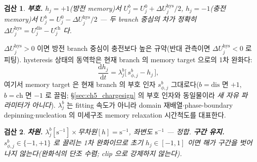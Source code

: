 \documentclass[11pt,a4paper]{article}
\newtheorem*{verifybox}{검산}
\newcommand{\dd}{\mathrm{d}}
\newcommand{\dis}{\mathrm{dis}}
\newcommand{\chg}{\mathrm{ch}}
\newcommand{\hys}{\mathrm{hys}}
\begin{document}
\begin{verifybox}
\textbf{부호.} $h_j=+1$(방전 memory)서 $U_j^b=U_j^0+\Delta U_j^\hys/2$, $h_j=-1$(충전 memory)서
$U_j^b=U_j^0-\Delta U_j^\hys/2$ — 두 branch 중심의 차가 정확히 $\Delta U_j^\hys=U_j^\dis-U_j^\chg$ 다.
\end{verifybox}

$\Delta U_j^\hys>0$ 이면 방전 branch 중심이 충전보다 높은 규약(반대 관측이면 $\Delta U_j^\hys<0$ 로 피팅).
hysteresis 상태의 동역학은 현재 branch 의 memory target 으로의 1차 완화다:
\begin{equation}
\frac{\dd h_j}{\dd t}=\lambda_j^b\big[\,s_{\phi,j}^b-h_j\,\big],
\label{eq:ch5_h_dyn}
\end{equation}
여기서 memory target 은 현재 branch 의 부호 인자 $s_{\phi,j}^b$ 그대로다($b=\dis$ 면 $+1$, $b=\chg$ 면 $-1$
로 끌림; \S\ref{sec:ch5_chargesign} 의 부호 인자와 동일물이라 \emph{새 자유 파라미터가 아니다}). $\lambda_j^b$
는 fitting 속도가 아니라 domain 재배열$\cdot$phase-boundary depinning$\cdot$nucleation 의 미세구조 memory
relaxation 시간척도를 대표한다.

\begin{verifybox}
\textbf{차원.} $\lambda_j^b[\mathrm{s^{-1}}]\times$무차원$[h]=\mathrm{s^{-1}}$, 좌변도 $\mathrm{s^{-1}}$ — 정합.
\textbf{구간 유지.} $s_{\phi,j}^b\in\{-1,+1\}$ 로 끌리는 1차 완화이므로 초기 $h_j\in[-1,1]$ 이면 해가 구간을
벗어나지 않는다(완화식의 단조 수렴; clip 으로 강제하지 않는다).
\end{verifybox}

\end{document}
